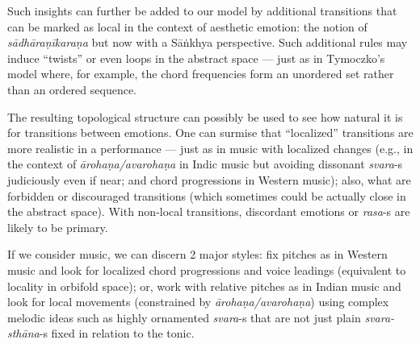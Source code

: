 Such insights can further be added to our model by additional transitions that can be marked as local in the context of aesthetic emotion: the notion of \textsl{sādhāraṇīkaraṇa} but now with a Sāṅkhya perspective. Such additional rules may induce “twists” or even loops in the abstract space --- just as in Tymoczko’s model where, for example, the chord frequencies form an unordered set rather than an ordered sequence.

The resulting topological structure can possibly be used to see how natural it is for transitions between emotions. One can surmise that “localized” transitions are more realistic in a performance --- just as in music with localized changes (e.g., in the context of \textsl{ārohaṇa/avarohaṇa} in Indic music but avoiding dissonant \textsl{svara}-s judiciously even if near; and chord progressions in Western music); also, what are forbidden or discouraged transitions (which sometimes could be actually close in the abstract space). With non-local transitions, discordant emotions or \textsl{rasa}-s are likely to be primary. 

If we consider music, we can discern 2 major styles: fix pitches as in Western music and look for localized chord progressions and voice leadings (equivalent to locality in orbifold space); or, work with relative pitches as in Indian music and look for local movements (constrained by \textsl{ārohaṇa/avarohaṇa}) using complex melodic ideas such as highly ornamented \textsl{svara}-s that are not just plain \textsl{svara-sthāna}-s fixed in relation to the tonic. 

